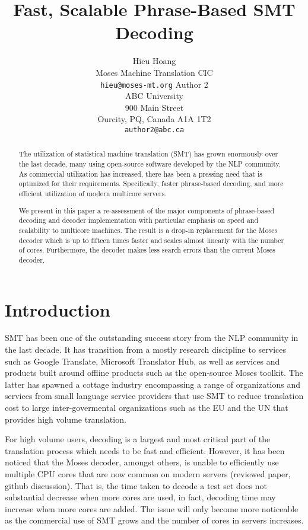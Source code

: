 \documentclass[11pt]{article}
\title{Fast, Scalable Phrase-Based SMT Decoding}
\author{Hieu Hoang\\
	    Moses Machine Translation CIC\\
	    {\tt hieu@moses-mt.org}
	  \And
	Author 2\\
  	ABC University\\
  	900 Main Street\\
  	Ourcity, PQ, Canada A1A 1T2\\
  {\tt author2@abc.ca}}
\date{}
\begin{document}
\maketitle

\begin{abstract}
The utilization of statistical machine translation (SMT) has grown enormously over the last decade, many using open-source software developed by the NLP community. As commercial utilization has increased, there has been a pressing need that is optimized for their requirements. Specifically, faster phrase-based decoding, and more efficient utilization of modern multicore servers.

We present in this paper a re-assessment of the major components of phrase-based decoding and decoder implementation with particular emphasis on speed and scalability to multicore machines. The result is a drop-in replacement for the Moses decoder which is up to fifteen times faster and scales almost linearly with the number of cores. Furthermore, the decoder makes less search errors than the current Moses decoder.

\end{abstract}

\section{Introduction}

SMT has been one of the outstanding success story from the NLP community in the last decade. It has transition from a mostly research discipline to services such as Google Translate, Microsoft Translator Hub, as well as services and products built around offline products such as the open-source Moses toolkit. The latter has spawned a cottage industry  encompassing a range of organizations and services from small language service providers that use SMT to reduce translation cost to large inter-govermental organizations such as the EU and the UN that provides high volume translation.

For high volume users, decoding is a largest and most critical part of the translation process which needs to be fast and efficient. However, it has been noticed that the Moses decoder, amongst others, is unable to efficiently use multiple CPU cores that are now common on modern servers (reviewed paper, github discussion). That is, the time taken to decode a test set does not substantial decrease when more cores are used, in fact, decoding time may increase when more cores are added. The issue will only become more noticeable as the commercial use of SMT grows and the number of cores in servers increases.
\end{document}
